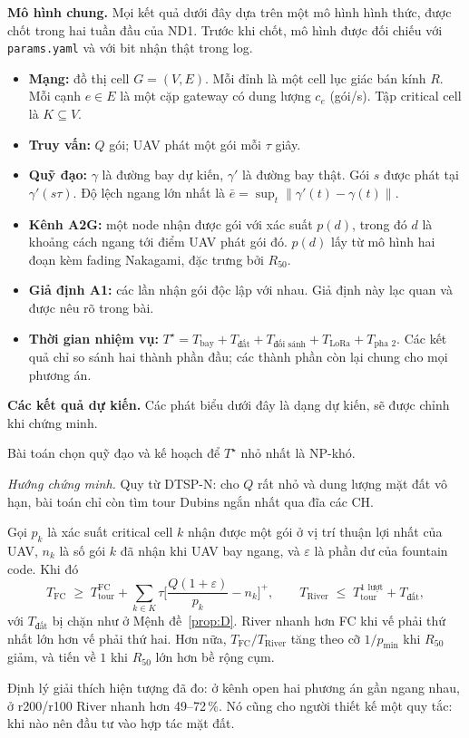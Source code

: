 \textbf{Mô hình chung.} Mọi kết quả dưới đây dựa trên một mô hình hình thức, được chốt trong hai tuần đầu của ND1. Trước khi chốt, mô hình được đối chiếu với \texttt{params.yaml} và với bit nhận thật trong log.

\begin{itemize}\tightlist
\item \textbf{Mạng:} đồ thị cell $G=(V,E)$. Mỗi đỉnh là một cell lục giác bán kính $R$. Mỗi cạnh $e\in E$ là một cặp gateway có dung lượng $c_e$ (gói/s). Tập critical cell là $K\subseteq V$.
\item \textbf{Truy vấn:} $Q$ gói; UAV phát một gói mỗi $\tau$ giây.
\item \textbf{Quỹ đạo:} $\gamma$ là đường bay dự kiến, $\gamma'$ là đường bay thật. Gói $s$ được phát tại $\gamma'(s\tau)$. Độ lệch ngang lớn nhất là $\bar e=\sup_t\lVert\gamma'(t)-\gamma(t)\rVert$.
\item \textbf{Kênh A2G:} một node nhận được gói với xác suất $p(d)$, trong đó $d$ là khoảng cách ngang tới điểm UAV phát gói đó. $p(d)$ lấy từ mô hình hai đoạn kèm fading Nakagami, đặc trưng bởi $R_{50}$.
\item \textbf{Giả định A1:} các lần nhận gói độc lập với nhau. Giả định này lạc quan và được nêu rõ trong bài.
\item \textbf{Thời gian nhiệm vụ:} $T^\star=T_{\text{bay}}+T_{\text{đất}}+T_{\text{đối sánh}}+T_{\text{LoRa}}+T_{\text{pha 2}}$. Các kết quả chỉ so sánh hai thành phần đầu; các thành phần còn lại chung cho mọi phương án.
\end{itemize}

\textbf{Các kết quả dự kiến.} Các phát biểu dưới đây là dạng dự kiến, sẽ được chỉnh khi chứng minh.

\begin{lemma}[Độ khó]\label{lem:np}
Bài toán chọn quỹ đạo và kế hoạch để $T^\star$ nhỏ nhất là NP-khó.
\end{lemma}
\noindent\emph{Hướng chứng minh.} Quy từ DTSP-N: cho $Q$ rất nhỏ và dung lượng mặt đất vô hạn, bài toán chỉ còn tìm tour Dubins ngắn nhất qua đĩa các CH.

\begin{theorem}\label{thm:A}
Gọi $p_k$ là xác suất critical cell $k$ nhận được một gói ở vị trí thuận lợi nhất của UAV, $n_k$ là số gói $k$ đã nhận khi UAV bay ngang, và $\varepsilon$ là phần dư của fountain code. Khi đó
\[
T_{\mathrm{FC}}\;\ge\;T^{\mathrm{FC}}_{\text{tour}}+\sum_{k\in K}\tau\Big[\frac{Q(1+\varepsilon)}{p_k}-n_k\Big]^+,
\qquad
T_{\mathrm{River}}\;\le\;T^{\text{1 lượt}}_{\text{tour}}+T_{\text{đất}},
\]
với $T_{\text{đất}}$ bị chặn như ở Mệnh đề~\ref{prop:D}. River nhanh hơn FC khi vế phải thứ nhất lớn hơn vế phải thứ hai. Hơn nữa, $T_{\mathrm{FC}}/T_{\mathrm{River}}$ tăng theo cỡ $1/p_{\min}$ khi $R_{50}$ giảm, và tiến về $1$ khi $R_{50}$ lớn hơn bề rộng cụm.
\end{theorem}
\noindent Định lý giải thích hiện tượng đã đo: ở kênh open hai phương án gần ngang nhau, ở r200/r100 River nhanh hơn 49–72\,\%. Nó cũng cho người thiết kế một quy tắc: khi nào nên đầu tư vào hợp tác mặt đất.

